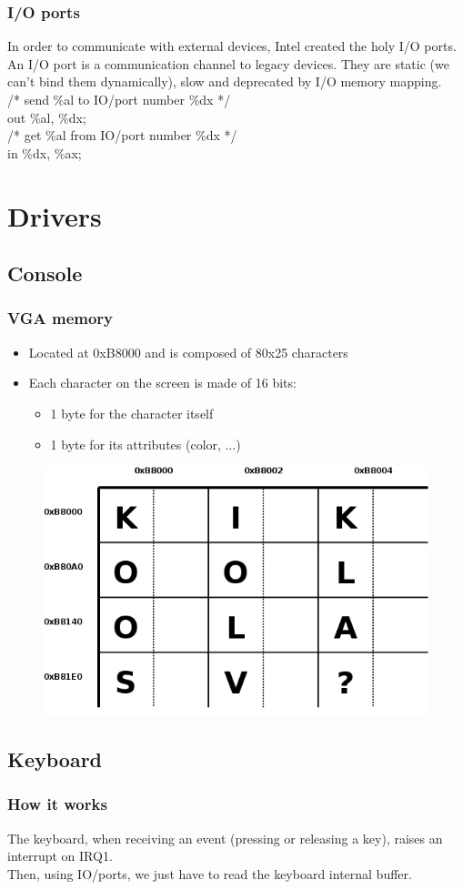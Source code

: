 \documentclass{beamer}
\begin{document}
\begin{frame}
  \frametitle{I/O ports}

  In order to communicate with external devices, Intel created the holy I/O ports.\\
  An I/O port is a communication channel to legacy devices. They are static (we can't bind them dynamically), slow and deprecated by I/O memory mapping.\\
  \vspace{20pt}
  /* send \%al to IO/port number \%dx */\\
  out \%al, \%dx;\\
  /* get \%al from IO/port number \%dx */\\
  in \%dx, \%ax;
\end{frame}

\section{Drivers}

\subsection{Console}

\begin{frame}
  \frametitle{VGA memory}

  \begin{itemize}
  \item
    Located at 0xB8000 and is composed of 80x25 characters
  \item
    Each character on the screen is made of 16 bits:
    \begin{itemize}
    \item
      1 byte for the character itself
    \item
      1 byte for its attributes (color, ...)
    \end{itemize}
  \end{itemize}
  \begin{figure}
  \includegraphics[scale=0.25]{vga.png}
  \end{figure}
\end{frame}

\subsection{Keyboard}

\begin{frame}
  \frametitle{How it works}

  The keyboard, when receiving an event (pressing or releasing a key), raises an interrupt on IRQ1.\\
  Then, using IO/ports, we just have to read the keyboard internal buffer.
\end{frame}
\end{document}
